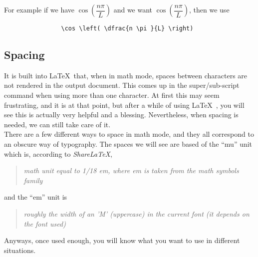 \documentclass[11pt,letterpaper,twoside,titlepage]{article}
\newcommand{\latex}{\LaTeX \ }
\begin{document}
			For example if we have $\cos ( \dfrac{n \pi}{L} )$ and we want $ \cos \left( \dfrac{n \pi }{L} \right) $, then we use
			
			\begin{verbatim}
				\cos \left( \dfrac{n \pi }{L} \right)
			\end{verbatim}
			
		\subsection{Spacing}
		
			It is built into \latex that, when in math mode, spaces between characters are not rendered in the output document.  This comes up in the super/sub-script command when using more than one character.  At first this may seem frustrating, and it is at that point, but after a while of using \latex, you will see this is actually very helpful and a blessing.  Nevertheless, when spacing is needed, we can still take care of it. \\
			
			There are a few different ways to space in math mode, and they all correspond to an obscure way of typography.  The spaces we will see are based of the ``mu'' unit which is, according to \emph{ShareLaTeX}, 
			
			\begin{quote}
				\emph{math unit equal to 1/18 em, where em is taken from the math symbols family}
			\end{quote}
			
			and the ``em'' unit is 
			
			\begin{quote}
				\emph{roughly the width of an 'M' (uppercase) in the current font (it depends on the font used)}
			\end{quote}
			
			Anyways, once used enough, you will know what you want to use in different situations.
			
\end{document}
